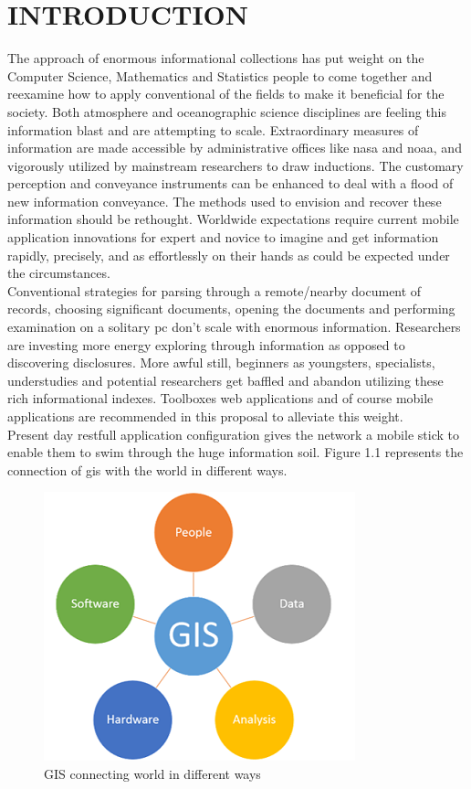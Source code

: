 \chapter{INTRODUCTION}
\label{chap:intro}


The approach of enormous informational collections has put weight on the Computer Science, Mathematics and Statistics people to come together and reexamine how to apply conventional of the fields to make it beneficial for the society. Both atmosphere and oceanographic science disciplines are feeling this information blast and are attempting to scale. Extraordinary measures of information are made accessible by administrative offices like \gls{nasa} and \gls{noaa}, and vigorously utilized by mainstream researchers to draw inductions. The customary perception and conveyance instruments can be enhanced to deal with a flood of new information conveyance. The methods used to envision and recover these information should be rethought. Worldwide expectations require current mobile application innovations for expert and novice to imagine and get information rapidly, precisely, and as effortlessly on their hands as could be expected under the circumstances. \\

Conventional strategies for parsing through a remote/nearby document of records, choosing significant documents, opening the documents and performing examination on a solitary \gls{pc} don't scale with enormous information. Researchers are investing more energy exploring through information as opposed to discovering disclosures. More awful still, beginners as youngsters, specialists, understudies and potential researchers get baffled and abandon utilizing these rich informational indexes. Toolboxes web applications and of course mobile applications are recommended in this proposal to alleviate this weight. \\

Present day \gls{restfull} application configuration gives the network a mobile stick to enable them to swim through the huge information soil. Figure 1.1 represents the connection of \gls{gis} with the world in different ways.

    \begin{figure}[H]
            \centering
            \includegraphics[width=0.50\linewidth]{figures/ch1/gis.png}
            \caption{\label{fig:gis_world} GIS connecting world in different ways \cite{CDC}}
    \end{figure}

